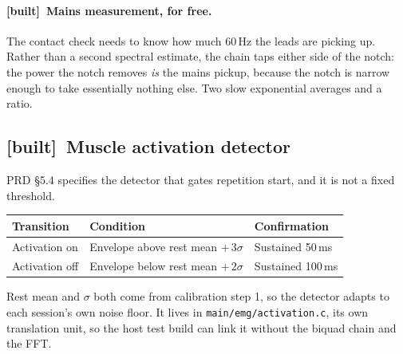 \documentclass[11pt]{article}
\newcommand{\built}{{\sffamily\scriptsize\color{good}\textbf{[built]}}\ }
\begin{document}
\paragraph{\built Mains measurement, for free.} The contact check needs to
know how much 60\,Hz the leads are picking up. Rather than a second spectral
estimate, the chain taps either side of the notch: the power the notch removes
\emph{is} the mains pickup, because the notch is narrow enough to take
essentially nothing else. Two slow exponential averages and a ratio.

\subsection{\built Muscle activation detector}

PRD \S5.4 specifies the detector that gates repetition start, and it is not a
fixed threshold.

\begin{table}[H]
\centering\small
\begin{tabularx}{\linewidth}{@{}p{26mm} p{40mm} X@{}}
\toprule
\textbf{Transition} & \textbf{Condition} & \textbf{Confirmation} \\
\midrule
Activation on & Envelope above rest mean $+\,3\sigma$ & Sustained 50\,ms \\
Activation off & Envelope below rest mean $+\,2\sigma$ & Sustained 100\,ms \\
\bottomrule
\end{tabularx}
\end{table}

\noindent
Rest mean and $\sigma$ both come from calibration step 1, so the detector
adapts to each session's own noise floor. It lives in
\texttt{main/emg/activation.c}, its own translation unit, so the host test
build can link it without the biquad chain and the FFT.
\end{document}
